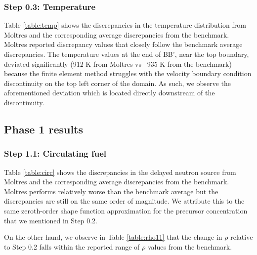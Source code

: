 \subsubsection{Step 0.3: Temperature}

Table \ref{table:temp} shows the discrepancies in the temperature distribution
from Moltres and the corresponding average discrepancies from the benchmark.
Moltres reported discrepancy values that closely follow the benchmark average
discrepancies. The temperature values at the end of BB', near the top boundary,
deviated significantly (912 K from Moltres
vs ~935 K from the benchmark) because the finite element method struggles with
the velocity boundary condition discontinuity on the top left corner of the
domain. As such, we observe the aforementioned deviation which is located
directly downstream of the discontinuity.

\subsection{Phase 1 results}

\subsubsection{Step 1.1: Circulating fuel}

Table \ref{table:circ} shows the discrepancies in the delayed neutron source
from Moltres and the corresponding average discrepancies from the benchmark.
Moltres performs relatively worse than the benchmark average but the
discrepancies are still on the same order of magnitude. We attribute this to
the same zeroth-order shape function approximation for the precursor
concentration that we mentioned in Step 0.2.

On the other hand, we observe in Table \ref{table:rho11} that the change in
$\rho$ relative to Step 0.2 falls within the reported range of $\rho$ values
from the benchmark.

